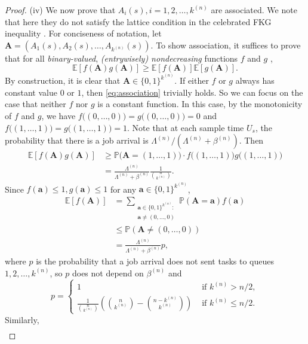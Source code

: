 \documentclass[sigconf]{acmart}
\renewcommand{\Pr}{\mathbb{P}} %
\newcommand{\expect}{\mathbb{E}} %
\newcommand{\supn}{^{(n)}}
\begin{document}
\begin{proof}
(iv) We now prove that $A_i(s),i=1,2,\dots,k\supn$ are associated. We note that here they do not satisfy the lattice condition in the celebrated FKG inequality \cite{ForKasGin_71}. For conciseness of notation, let $\bm{A}=(A_1(s),A_2(s),\dots,A_{k\supn}(s))$. To show association, it suffices to prove that for all \emph{binary-valued}, \emph{(entrywisely) nondecreasing} functions $f$ and $g$ \cite{EsaProWal_67},
\begin{equation}\label{eq:association}
\expect[f(\bm{A})g(\bm{A})]\ge \expect[f(\bm{A})]\expect[g(\bm{A})].
\end{equation}
By construction, it is clear that $\bm{A}\in\{0,1\}^{k\supn}$.  If either $f$ or $g$ always has constant value $0$ or $1$, then \eqref{eq:association} trivially holds.  So we can focus on the case that neither $f$ nor $g$ is a constant function.  In this case, by the monotonicity of $f$ and $g$, we have $f\bigl((0,\dots,0)\bigr)=g\bigl((0,\dots,0)\bigr)=0$ and $f\bigl((1,\dots,1)\bigr)=g\bigl((1,\dots,1)\bigr)=1$. Note that at each sample time $U_s$, the probability that there is a job arrival is $\Lambda\supn/(\Lambda\supn+\beta\supn)$. Then
\begin{align*}
\expect[f(\bm{A})g(\bm{A})]&\ge \Pr\bigl(\bm{A}=(1,\dots,1)\bigr)\cdot f\bigl((1,\dots,1)\bigr)g\bigl((1,\dots,1)\bigr)\\
&=\frac{\Lambda\supn}{\Lambda\supn+\beta\supn} \frac{1}{\binom{n}{k\supn}}.
\end{align*}
Since $f(\bm{a})\le 1,g(\bm{a})\le 1$ for any $\bm{a}\in\{0,1\}^{k\supn}$,
\begin{align*}
\expect[f(\bm{A})]&= \sum_{\substack{\bm{a}\in\{0,1\}^{k\supn}:\\\bm{a}\neq (0,\dots,0)}}\Pr(\bm{A}=\bm{a})f(\bm{a})\\
&\le \Pr(\bm{A}\neq (0,\dots,0))\\
&=\frac{\Lambda\supn}{\Lambda\supn+\beta\supn}p,
\end{align*}
where $p$ is the probability that a job arrival does not sent tasks to queues $1,2,\dots,k\supn$, so $p$ does not depend on $\beta\supn$ and
\begin{equation*}
p=
\begin{cases}
1 & \text{ if }k\supn>n/2,\\
\frac{1}{\binom{n}{k\supn}}\left(\binom{n}{k\supn}-\binom{n-k\supn}{k\supn}\right) & \text{ if }k\supn \le n/2.
\end{cases}
\end{equation*}
Similarly,
\begin{align*}

\end{align*}
\end{proof}
\end{document}
